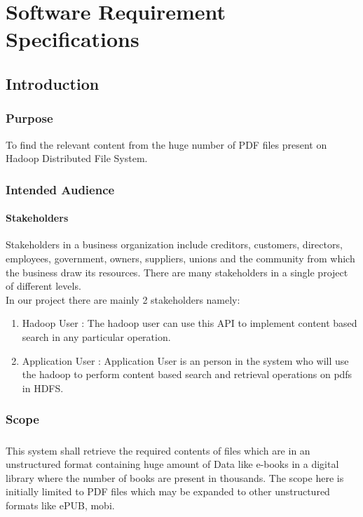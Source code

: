 \chapter{Software Requirement Specifications}
\section{Introduction}
\subsection{Purpose}
To find the relevant content from the huge number of PDF files present on Hadoop Distributed File System. \\

\subsection{Intended Audience}
\subsubsection{Stakeholders}
Stakeholders in a  business organization include creditors, customers, directors, employees, government, owners, suppliers, unions and the community from which the business draw its resources. There are many stakeholders in a single project of different levels.\\
In our project there are mainly 2 stakeholders namely:\\

\begin{enumerate}
\item Hadoop User : The hadoop user can use this API to implement content based search in any particular operation.
\item Application User : Application User is an person in the system who will use the hadoop to perform content based search and retrieval operations on pdfs in HDFS.
\end{enumerate}

\subsection{Scope}
\paragraph{} This system shall retrieve the required contents of files which are in an unstructured format containing huge amount of Data like e-books in a digital library where the number of books are present in thousands. The scope here is initially limited to PDF files which may be expanded to other unstructured formats like ePUB, mobi.
